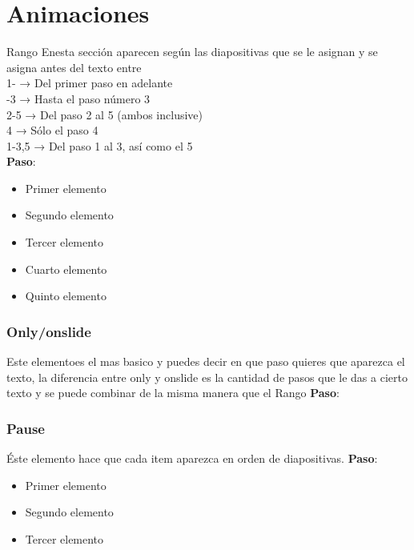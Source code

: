 \documentclass{beamer}
\begin{document}
\section{Animaciones}
\begin{frame}{Rango}
  Enesta sección aparecen según las diapositivas que se le asignan y se asigna antes del texto entre\\
  1- → Del primer paso en adelante\\
-3 → Hasta el paso número 3\\
2-5 → Del paso 2 al 5 (ambos inclusive)\\
4 → Sólo el paso 4\\
1-3,5 → Del paso 1 al 3, así como el 5\\
\Large{
  \textbf{Paso}:
  }
    \begin{itemize}
    \item <1->Primer elemento
    \item <2-5>Segundo elemento
    \item <-3>Tercer elemento
    \item <4>Cuarto elemento
    \item <1-3,5>Quinto elemento
  \end{itemize}
\end{frame}
\begin{frame}
  \frametitle{Only/onslide}
  Este elementoes el mas basico y puedes decir en que paso quieres que aparezca el texto, la 
  diferencia entre only y onslide es la cantidad de pasos que le das a cierto texto y se
  puede combinar de la misma manera que el Rango 
  \Huge{
  \textbf{Paso}:
  }
  

\end{frame}
\begin{frame}
  \frametitle{Pause}
  Éste elemento hace que cada item aparezca en orden de diapositivas.
  \Large{
  \textbf{Paso}:
  }
  \begin{itemize}
    \item Primer elemento \pause
    \item Segundo elemento \pause
    \item Tercer elemento
    \end{itemize}
\end{frame}
\end{document}
